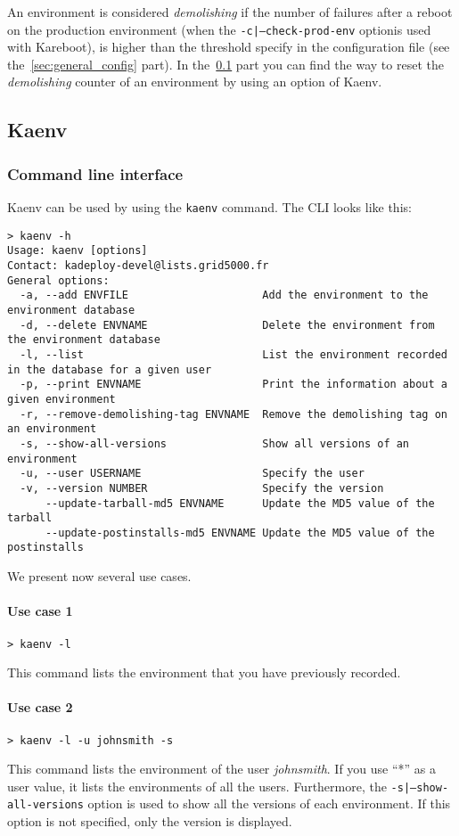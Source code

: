 \documentclass[a4wide,10pt,oneside]{book}
\begin{document}
An environment is considered \textit{demolishing} if the number of failures after a reboot on the production environment (when the \texttt{-c|--check-prod-env} optionis used with Kareboot), is higher than the threshold specify in the configuration file (see the~\ref{sec:general_config} part). In the~\ref{sec:kaenv} part you can find the way to reset the \textit{demolishing} counter of an environment by using an option of Kaenv.


\subsection{Kaenv}\label{sec:kaenv}
\subsubsection{Command line interface}
Kaenv can be used by using the \texttt{kaenv} command. The CLI looks like this:
\begin{small}
\begin{verbatim}
> kaenv -h
Usage: kaenv [options]
Contact: kadeploy-devel@lists.grid5000.fr
General options:
  -a, --add ENVFILE                     Add the environment to the environment database
  -d, --delete ENVNAME                  Delete the environment from the environment database
  -l, --list                            List the environment recorded in the database for a given user
  -p, --print ENVNAME                   Print the information about a given environment
  -r, --remove-demolishing-tag ENVNAME  Remove the demolishing tag on an environment
  -s, --show-all-versions               Show all versions of an environment
  -u, --user USERNAME                   Specify the user
  -v, --version NUMBER                  Specify the version
      --update-tarball-md5 ENVNAME      Update the MD5 value of the tarball
      --update-postinstalls-md5 ENVNAME Update the MD5 value of the postinstalls
\end{verbatim}
\end{small}

We present now several use cases.
\paragraph{Use case 1}
\begin{verbatim}
> kaenv -l
\end{verbatim}
This command lists the environment that you have previously recorded.

\paragraph{Use case 2}
\begin{verbatim}
> kaenv -l -u johnsmith -s
\end{verbatim}
This command lists the environment of the user \textit{johnsmith}. If you use ``*'' as a user value, it lists the environments of all the users. Furthermore, the \texttt{-s|--show-all-versions} option is used to show all the versions of each environment. If this option is not specified, only the version is displayed.
\end{document}
